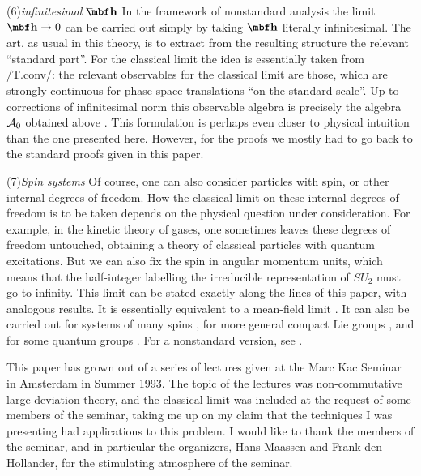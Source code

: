 \item{(6)}{\it infinitesimal $\hb$}\hfill\break
In the framework of nonstandard analysis \cite{AlbevBook} the limit
$\hb\to0$ can be carried out simply by taking $\hb$ literally
infinitesimal. The art, as usual in this theory, is to extract from
the resulting structure the relevant ``standard part''. For the
classical limit the idea is essentially taken from \Thm/T.conv/: the
relevant observables for the classical limit are those, which are
strongly continuous for phase space translations ``on the standard
scale''. Up to corrections of infinitesimal norm this observable
algebra is precisely the algebra ${\cal A}_0$ obtained above \cite{IHQ}.
This formulation is perhaps even closer to physical intuition than
the one presented here. However, for the proofs we mostly had to
go back to the standard proofs given in this paper.

\item{(7)}{\it Spin systems}\hfill\break
Of course, one can also consider particles with spin, or other
internal degrees of freedom. How the classical limit on these
internal degrees of freedom is to be taken depends on the physical
question under consideration. For example, in the kinetic theory of
gases, one sometimes leaves these degrees of freedom untouched,
obtaining a theory of classical particles with quantum excitations.
But we can also fix the spin in angular momentum units, which means
that the half-integer labelling the irreducible representation of
$SU_2$ must go to infinity. This limit can be stated exactly along
the lines of this paper, with analogous results. It is essentially
equivalent to a mean-field limit \cite{FGH}. It can also be carried
out for systems of many spins \cite{IMF}, for more general compact
Lie groups \cite{Nick}, and for some quantum groups \cite{FGH}.
For a nonstandard version, see \cite{IHQ}.

\def\refskip{\vskip 8pt plus 2pt}
\let\REF\doref
\Acknow
This paper has grown out of a series of lectures given at the Marc
Kac Seminar in Amsterdam in Summer 1993. The topic of the lectures
was non-commutative large deviation theory, and the classical limit
was included at the request of some members of the seminar, taking me
up on my claim that the techniques I was presenting had applications
to this problem. I would like to thank the members of the seminar,
and in particular the organizers, Hans Maassen and Frank den
Hollander, for the stimulating atmosphere of the seminar.

